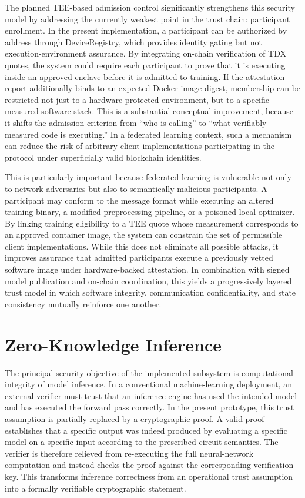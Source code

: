 The planned TEE-based admission control significantly strengthens this security model by addressing the currently weakest point in the trust chain: participant enrollment. In the present implementation, a participant can be authorized by address through DeviceRegistry, which provides identity gating but not execution-environment assurance. By integrating on-chain verification of TDX quotes, the system could require each participant to prove that it is executing inside an approved enclave before it is admitted to training. If the attestation report additionally binds to an expected Docker image digest, membership can be restricted not just to a hardware-protected environment, but to a specific measured software stack. This is a substantial conceptual improvement, because it shifts the admission criterion from “who is calling” to “what verifiably measured code is executing.” In a federated learning context, such a mechanism can reduce the risk of arbitrary client implementations participating in the protocol under superficially valid blockchain identities.

This is particularly important because federated learning is vulnerable not only to network adversaries but also to semantically malicious participants. A participant may conform to the message format while executing an altered training binary, a modified preprocessing pipeline, or a poisoned local optimizer. By linking training eligibility to a TEE quote whose measurement corresponds to an approved container image, the system can constrain the set of permissible client implementations. While this does not eliminate all possible attacks, it improves assurance that admitted participants execute a previously vetted software image under hardware-backed attestation. In combination with signed model publication and on-chain coordination, this yields a progressively layered trust model in which software integrity, communication confidentiality, and state consistency mutually reinforce one another.



\section{Zero-Knowledge Inference}

The principal security objective of the implemented subsystem is computational integrity of model inference. In a conventional machine-learning deployment, an external verifier must trust that an inference engine has used the intended model and has executed the forward pass correctly. In the present prototype, this trust assumption is partially replaced by a cryptographic proof. A valid proof establishes that a specific output was indeed produced by evaluating a specific model on a specific input according to the prescribed circuit semantics. The verifier is therefore relieved from re-executing the full neural-network computation and instead checks the proof against the corresponding verification key. This transforms inference correctness from an operational trust assumption into a formally verifiable cryptographic statement.

